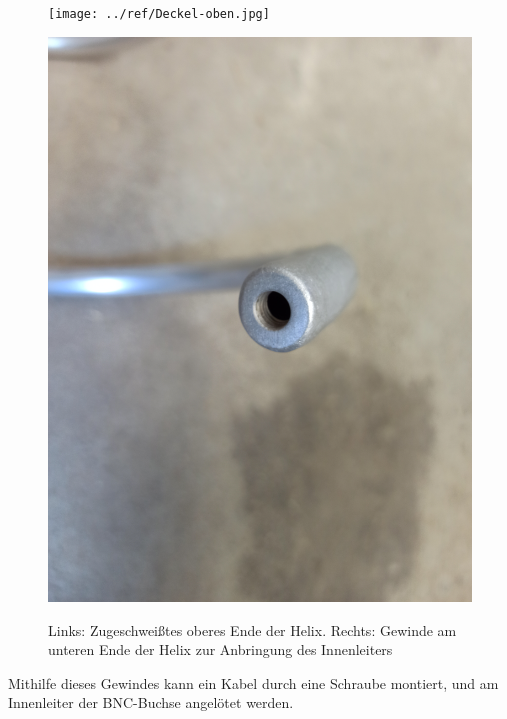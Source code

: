\begin{figure}[h!]
	\begin{minipage}[b]{.4\linewidth} %
		\texttt{[image: ../ref/Deckel-oben.jpg]}
		\label{fig:Deckel-Helix-Oben}
	\end{minipage}
	\hspace{.1\linewidth}%
	\begin{minipage}[b]{.4\linewidth} %
		\includegraphics[width=\linewidth]{../ref/Anschluss-unten.jpg}
		\label{fig:Deckel-Helix-Unten}
	\end{minipage}
	\caption{Links: Zugeschweißtes oberes Ende der Helix. Rechts: Gewinde am unteren Ende der Helix zur Anbringung des Innenleiters}
\end{figure}

Mithilfe dieses Gewindes kann ein Kabel durch eine Schraube montiert, und am Innenleiter der BNC-Buchse angelötet werden.

